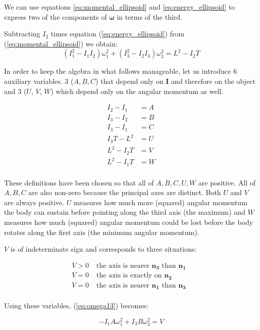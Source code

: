 \documentclass[a4paper, 12pt]{article}
\begin{document}
We can use equations \ref{eq:momental_ellipsoid} and \ref{eq:energy_ellipsoid} to express two of the components of $\boldsymbol{\omega}$ in terms of the third.

Subtracting $I_2$ times equation (\ref{eq:energy_ellipsoid}) from (\ref{eq:momental_ellipsoid}) we obtain:
\begin{equation}
  (I_1^2 - I_1I_2)\omega_1^2 + (I_3^2 - I_2I_3)\omega_3^2 = L^2 - I_2T \label{eq:omega13}
\end{equation}

In order to keep the algebra in what follows manageable, let us introduce 6 auxiliary variables. 3 ($A, B, C$) that depend only on $\bm{I}$ and therefore on the object and 3 ($U$, $V$, $W$) which depend only on the angular momentum as well.

\begin{align}
  I_2 - I_1 &= A \\
I_3 - I_2 &= B \\
I_3 - I_1 &= C \\
I_3T - L^2 &= U \\
L^2 - I_2 T &= V \\
L^2 - I_1 T &= W \\
\end{align}

These definitions have been chosen so that all of $A, B, C, U, W$ are positive. All of $A, B, C$ are also non-zero because the principal axes are distinct. Both $U$ and $V$ are always positive. $U$ measures how much more (squared) angular momentum the body can sustain before pointing along the third axis (the maximum) and $W$ measures how much (squared) angular momentum could be lost before the body rotates along the first axis (the minimum angular momentum).

$V$ is of indeterminate sign and corresponds to three situations:

\begin{align}
  V > 0 & \;\textrm{the axis is nearer $\bm{n_3}$ than  $\bm{n_1}$ }\\
  V = 0 & \;\textrm{the axis is exactly on $\bm{n_2}$} \\
  V = 0 & \;\textrm{the axis is nearer $\bm{n_1}$ than  $\bm{n_3}$} \\
\end{align}

Using these variables, (\ref{eq:omega13}) becomes:

\begin{equation}
  -I_1A\omega_1^2 + I_3B\omega_3^2 = V \label{eq:omega13s}
\end{equation}
\end{document}
